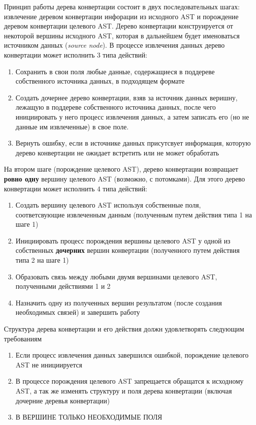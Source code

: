 Принцип работы дерева конвертации состоит в двух последовательных шагах: извлечение деревом конвертации инфорации из исходного AST и порождение деревом конвертации целевого AST. Дерево конвертации конструируется от некоторой вершины исходного AST, которая в дальнейшем будет именоваться источником данных (\textit{source node}). В процессе извлечения данных дерево конвертации может исполнить 3 типа действий:

\begin{enumerate}
    \item Сохранить в свои поля любые данные, содержащиеся в поддереве собственного источника данных, в подходящем формате
    \item Создать дочернее дерево конвертации, взяв за источник данных веришну, лежащую в поддереве собственного источника данных, после чего инициировать у него процесс извлечения данных, а затем записать его (но не данные им извлеченные) в свое поле. 
    \item Вернуть ошибку, если в источнике данных присутсвует информация, которую дерево конвертации не ожидает встретить или не может обработать
\end{enumerate}

На втором шаге (порождение целевого AST), дерево конвертации возвращает \textbf{ровно одну} вершину целевого AST (возможно, с потомками). Для этого дерево конвертации может исполнить 4 типа действий:

\begin{enumerate}
    \item Создать вершину целевого AST используя собственные поля, соответсвующие извлеченным данным (полученным путем действия типа 1 на шаге 1)
    \item Инициировать процесс порождения вершины целевого AST у одной из собственных \textbf{дочерних} вершин конвертации (полученного путем действия типа 2 на шаге 1)
    \item Образовать связь между любыми двумя вершинами целевого AST, полученными действиями 1 и 2
    \item Назначить одну из полученных вершин результатом (после создания необходимых связей) и завершить работу
\end{enumerate}

Структура дерева конвертации и его действия должн удовлетворять следующим требованиям
\begin{enumerate}
    \item Если процесс извлечения данных завершился ошибкой, порождение целевого AST не инициируется
    \item В процессе порождения целевого AST запрещается обращатся к исходному AST, а так же изменять структуру и поля дерева конвертации (включая дочерние деревья конвертации)
    \item В ВЕРШИНЕ ТОЛЬКО НЕОБХОДИМЫЕ ПОЛЯ
\end{enumerate}

